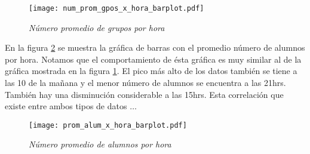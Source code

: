 \begin{figure}[H]
\centering
\texttt{[image: num\_prom\_gpos\_x\_hora\_barplot.pdf]} %
\caption{\textit{Número promedio de grupos por hora}}\label{num_prom_gpos_x_hora_barplot}
\end{figure}

En la figura \ref{prom_alum_x_hora_barplot} se muestra la gráfica de barras con el promedio número de alumnos por hora. Notamos que el comportamiento de ésta gráfica es muy similar al de la gráfica mostrada en la figura \ref{num_prom_gpos_x_hora_barplot}. El pico más alto de los datos también se tiene a las 10 de la mañana y el menor número de alumnos se encuentra a las 21hrs. También hay una disminución considerable a las 15hrs. Esta correlación que existe entre ambos tipos de datos $\ldots$

\begin{figure}[H]
\centering
\texttt{[image: prom\_alum\_x\_hora\_barplot.pdf]} %
\caption{\textit{Número promedio de alumnos por hora}}\label{prom_alum_x_hora_barplot}
\end{figure}

